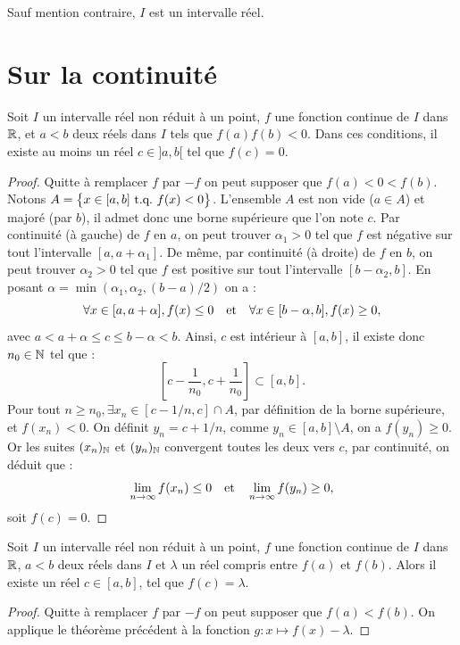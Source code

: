 \documentclass{article}
\begin{document}
Sauf mention contraire, $I$ est un intervalle réel.

\section{Sur la continuité}

\begin{thm}
Soit $I$ un intervalle réel non réduit à un point, $f$ une fonction continue de $I$ dans $\mathbb{R}$, et $a<b$ deux réels dans $I$ tels que 
$f(a)f(b)<0$. Dans ces conditions, il existe au moins un réel $c \in ]a,b[$ tel que $f(c)=0$.
\end{thm}

\begin{proof}
Quitte à remplacer $f$ par $-f$ on peut supposer que $f(a) < 0 < f(b)$. Notons $A = \bigl\{ x \in [a,b] \text{~t.q.~} f(x) < 0 \bigr\}$. L'ensemble $A$
est non vide ($a \in A$) et majoré (par $b$), il admet donc une borne supérieure que l'on note $c$.
Par continuité (à gauche) de $f$ en $a$, on peut trouver $\alpha_1 >0$ tel que $f$ est négative sur tout l'intervalle $[a, a+\alpha_1]$.
De même, par continuité (à droite) de $f$ en $b$, on peut trouver $\alpha_2 > 0$ tel que $f$ est positive sur tout l'intervalle 
$[b - \alpha_2, b]$. En posant $\alpha = \min(\alpha_1, \alpha_2, (b-a)/2)$ on a :
\[ \forall x \in [a, a + \alpha ], f(x) \leq 0 \quad \text{et} \quad \forall x \in [b-\alpha , b], f(x) \geq 0 , \]
avec $a < a + \alpha \leq c \leq b - \alpha < b$. Ainsi, $c$ est intérieur à $[a,b]$, il existe donc $n_0 \in \mathbb{N}$ tel que :
\[ \left [ c - \dfrac1{n_0} , c + \dfrac1{n_0} \right ] \subset [a,b] . \]
Pour tout $n \geq n_0, \exists x_n \in [c - 1/n, c] \cap A$, par définition de la borne supérieure, et $f(x_n) < 0$.
On définit $y_n = c + 1/n$, comme $y_n \in [a,b] \setminus A$, on a $f(y_n) \geq 0$. Or les suites $(x_n)_{\mathbb{N}}$ et $(y_n)_{\mathbb{N}}$ convergent 
toutes les deux vers $c$, par continuité, on déduit que :
\[ \lim_{n \to \infty} f(x_n) \leq 0 \quad \text{et} \quad \lim_{n \to \infty} f(y_n) \geq 0, \]
soit $f(c) = 0$.
\end{proof}

\begin{coro}
Soit $I$ un intervalle réel non réduit à un point, $f$ une fonction continue de $I$ dans $\mathbb{R}$, $a<b$ deux réels dans $I$ et $\lambda$ un réel
compris entre $f(a)$ et $f(b)$. Alors il existe un réel $c \in [a,b]$, tel que $f(c)=\lambda$.
\end{coro}

\begin{proof}
Quitte à remplacer $f$ par $-f$ on peut supposer que $f(a) < f(b)$. On applique le théorème précédent à la fonction 
$g : x \mapsto f(x) - \lambda$.
\end{proof}
\end{document}
